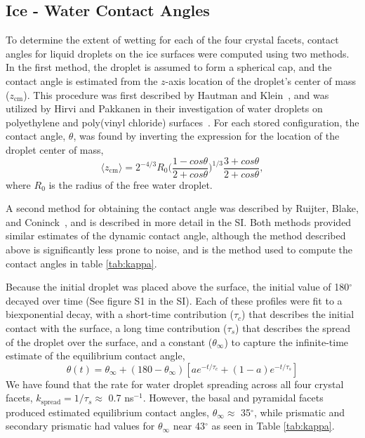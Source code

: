 \documentclass{pnastwo}
\begin{document}
\begin{article}
\subsection{Ice - Water Contact Angles}
To determine the extent of wetting for each of the four crystal
facets, contact angles for liquid droplets on the ice surfaces were
computed using two methods.  In the first method, the droplet is
assumed to form a spherical cap, and the contact angle is estimated
from the $z$-axis location of the droplet's center of mass
($z_\mathrm{cm}$).  This procedure was first described by Hautman and
Klein~\cite{Hautman91}, and was utilized by Hirvi and Pakkanen in
their investigation of water droplets on polyethylene and poly(vinyl
chloride) surfaces~\cite{Hirvi06}. For each stored configuration, the
contact angle, $\theta$, was found by inverting the expression for the
location of the droplet center of mass,
\begin{equation}\label{contact_1}
\langle z_\mathrm{cm}\rangle = 2^{-4/3}R_{0}\bigg(\frac{1-cos\theta}{2+cos\theta}\bigg)^{1/3}\frac{3+cos\theta}{2+cos\theta} ,
\end{equation}
where $R_{0}$ is the radius of the free water droplet. 

A second method for obtaining the contact angle was described by
Ruijter, Blake, and Coninck~\cite{Ruijter99}, and is described in more
detail in the SI.  Both methods provided similar estimates of the
dynamic contact angle, although the method described above is
significantly less prone to noise, and is the method used to compute
the contact angles in table \ref{tab:kappa}.

Because the initial droplet was placed above the surface, the initial
value of 180$^{\circ}$ decayed over time (See figure S1 in the SI).
Each of these profiles were fit to a biexponential decay, with a
short-time contribution ($\tau_c$) that describes the initial contact
with the surface, a long time contribution ($\tau_s$) that describes
the spread of the droplet over the surface, and a constant
($\theta_\infty$) to capture the infinite-time estimate of the
equilibrium contact angle,
\begin{equation}
\theta(t) = \theta_\infty +  (180-\theta_\infty) \left[ a e^{-t/\tau_c} +
  (1-a) e^{-t/\tau_s}  \right]
\end{equation}
We have found that the rate for water droplet spreading across all
four crystal facets, $k_\mathrm{spread} = 1/\tau_s \approx$ 0.7
ns$^{-1}$. However, the basal and pyramidal facets produced estimated
equilibrium contact angles, $\theta_\infty \approx$ 35$^{\circ}$, while
prismatic and secondary prismatic had values for $\theta_\infty$ near
43$^{\circ}$ as seen in Table \ref{tab:kappa}.


\end{article}
\end{document}
